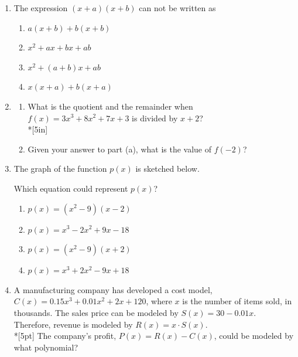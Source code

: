\documentclass[12pt, oneside]{article}
\begin{document}
\begin{enumerate}
\newpage

\item The expression $(x + a)(x + b)$ can not be written as
\begin{enumerate}
    \item $a(x + b)+ b(x + b)$
    \item $x^2 + ax + bx + ab$ 
    \item  $x^2 + (a + b)x + ab$  
    \item $x(x + a)+ b(x + a)$
\end{enumerate}

\item 
\begin{enumerate}
    \item What is the quotient and the remainder when $f(x)=3x^3+8x^2+7x+3$ is divided by $x+2$?\\*[5in]
    \item Given your answer to part (a), what is the value of $f(-2)$?
\end{enumerate}


\newpage
\item The graph of the function $p(x)$ is sketched below.
\begin{center}
\end{center}
Which equation could represent $p(x)$?
\begin{enumerate}
    \item $p(x)=(x^2- 9)(x-2)$
    \item $p(x)=x^3 -2x^2+ 9x-18$
    \item $p(x)=(x^2- 9)(x+2)$
    \item $p(x)=x^3 +2x^2- 9x+18$
\end{enumerate} %

\item A manufacturing company has developed a cost model, $C(x)=0.15x^3+0.01x^2+2x+120$, where $x$ is the number of items sold, in thousands. The sales price can be modeled by $S(x)=30-0.01x$. Therefore, revenue is modeled by $R(x)=x \cdot S(x)$.\\*[5pt]
The company’s profit, $P(x)=R(x)-C(x)$, could be modeled by what polynomial?  %


\end{enumerate}
\end{document}
